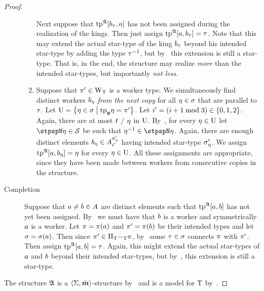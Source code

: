 \begin{proof}
\begin{description}
\begin{enumerate}
    Next suppose that $\operatorname{tp}^{\mathfrak{A}}[b_{\tau},a]$ has not been assigned during
    the realization of the kings.
    Then just assign $\operatorname{tp}^{\mathfrak{A}}[a,b_{\tau}] = \tau$.
    Note that this may extend the actual star-type of the king $b_{\tau}$ beyond
    his intended star-type by adding the type $\tau^{-1}$, but
    by~ this extension is still a star-type.
    That is, in the end, the structure may realize \emph{more} than the intended
    star-types, but importantly \emph{not less}.
    \item
    Suppose that ${\pi'} \in {\mathrm{W}}_{\mathrm{T}}$ is a worker type.
    We simultaneously find distinct workers $b_{\eta}$ \emph{from the next copy}
    for all $\eta\in\sigma$ that are parallel to $\tau$.
    Let $\mathrm{U} = \left\{\eta\in\sigma\mathrel{}\middle|\mathrel{}\mathrm{tp}_{\bm{y}}\eta = {\pi'}\right\}$.
    Let ${i'} = (i+1 \bmod 3) \in \left\{0,1,2\right\}$.
    Again, there are at most $t$ \twotypes/ $\eta$ in $\mathrm{U}$.
    By~, for every $\eta \in \mathrm{U}$ let $\stpspN\tpu \in \Cert$
    be such that $\inv\tpu \in \stpspN\tpu$.
    Again, there are enough distinct elements $b_{\eta} \in
    A^{{\sigma_{\eta}'}}_{{i'}}$ having intended star-type ${\sigma_{\eta}'}$.
    We assign $\operatorname{tp}^{\mathfrak{A}}[a,b_{\eta}] = \eta$ for every $\eta \in \mathrm{U}$.
    All these assignments are appropriate, since they have been made between
    workers from consecutive copies in the structure.
  \end{enumerate}
  \item[Completion]
  Suppose that $a\neq b \in A$ are distinct elements such that
  $\operatorname{tp}^{\mathfrak{A}}[a,b]$ has not yet been assigned. 
  By~ we must have that $b$ is a worker and symmetrically $a$
  is a worker.
  Let $\pi = \pi(a)$ and ${\pi'} = \pi(b)$ be their intended types and
  let $\sigma = \sigma(a)$. 
  Then since ${\pi'} \in {\Pi}_{\mathrm{T}} {-}_{\mathrm{T}} \pi$, by~ some
  $\tau\in\sigma$ connects $\pi$ with ${\pi'}$.
  Then assign $\operatorname{tp}^{\mathfrak{A}}[a,b] = \tau$. Again, this might extend the actual
  star-types of $a$ and $b$ beyond their intended star-types, but
  by~, this extension is still a star-type.
\end{description}
The structure $\mathfrak{A}$ is a $\left\langle \mathrm{\Sigma},\bar{\bm{m}} \right\rangle$-structure by~ and is
a model for $\mathrm{T}$ by~.
\end{proof}

